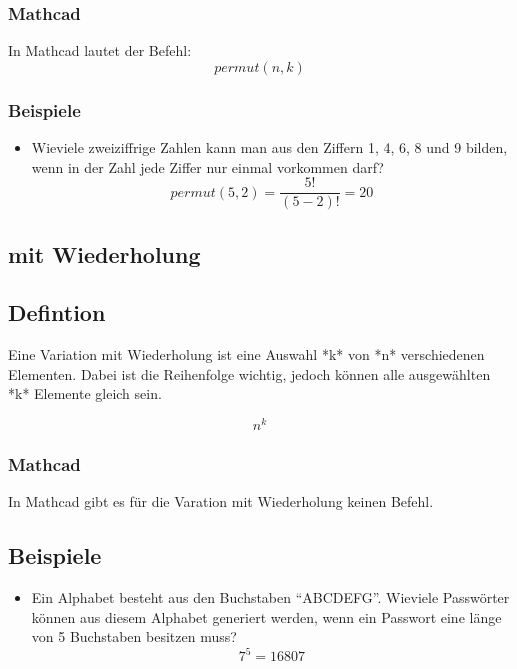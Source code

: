 \documentclass[a4paper,10pt]{article}
\begin{document}
\subsubsection{Mathcad}
In Mathcad lautet der Befehl:
\begin{equation}
  \label{eq:7}
  permut(n, k)
\end{equation}

\subsubsection{Beispiele}
\begin{itemize}
\item {
    Wieviele zweiziffrige Zahlen kann man aus den Ziffern 1, 4, 6, 8
    und 9 bilden, wenn in der Zahl jede Ziffer nur einmal vorkommen
    darf?
    \begin{equation}
      \label{eq:8}
      permut(5, 2) = \frac{5!}{(5 - 2)!} = 20
    \end{equation}
  }
\end{itemize}

\subsection{mit Wiederholung}
\subsection{Defintion}
Eine Variation mit Wiederholung ist eine Auswahl *k* von *n*
verschiedenen Elementen. Dabei ist die Reihenfolge wichtig, jedoch
können alle ausgewählten *k* Elemente gleich sein.

\begin{equation}
  \label{eq:11}
  n^k
\end{equation}

\subsubsection{Mathcad}
In Mathcad gibt es für die Varation mit Wiederholung keinen Befehl.

\subsection{Beispiele}
\begin{itemize}
\item {
    Ein Alphabet besteht aus den Buchstaben ``ABCDEFG''. Wieviele
    Passwörter können aus diesem Alphabet generiert werden, wenn ein
    Passwort eine länge von 5 Buchstaben besitzen muss?
    \begin{equation}
      \label{eq:12}
      7^5 = 16807
    \end{equation}
  }
\end{itemize}
\end{document}

